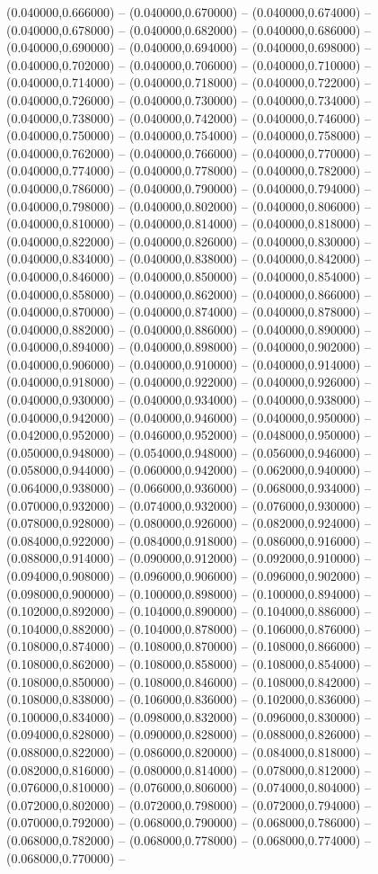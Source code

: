 (0.040000,0.666000) -- (0.040000,0.670000) -- (0.040000,0.674000) -- (0.040000,0.678000) -- (0.040000,0.682000) -- (0.040000,0.686000) -- (0.040000,0.690000) -- (0.040000,0.694000) -- (0.040000,0.698000) -- (0.040000,0.702000) -- (0.040000,0.706000) -- (0.040000,0.710000) -- (0.040000,0.714000) -- (0.040000,0.718000) -- (0.040000,0.722000) -- (0.040000,0.726000) -- (0.040000,0.730000) -- (0.040000,0.734000) -- (0.040000,0.738000) -- (0.040000,0.742000) -- (0.040000,0.746000) -- (0.040000,0.750000) -- (0.040000,0.754000) -- (0.040000,0.758000) -- (0.040000,0.762000) -- (0.040000,0.766000) -- (0.040000,0.770000) -- (0.040000,0.774000) -- (0.040000,0.778000) -- (0.040000,0.782000) -- (0.040000,0.786000) -- (0.040000,0.790000) -- (0.040000,0.794000) -- (0.040000,0.798000) -- (0.040000,0.802000) -- (0.040000,0.806000) -- (0.040000,0.810000) -- (0.040000,0.814000) -- (0.040000,0.818000) -- (0.040000,0.822000) -- (0.040000,0.826000) -- (0.040000,0.830000) -- (0.040000,0.834000) -- (0.040000,0.838000) -- (0.040000,0.842000) -- (0.040000,0.846000) -- (0.040000,0.850000) -- (0.040000,0.854000) -- (0.040000,0.858000) -- (0.040000,0.862000) -- (0.040000,0.866000) -- (0.040000,0.870000) -- (0.040000,0.874000) -- (0.040000,0.878000) -- (0.040000,0.882000) -- (0.040000,0.886000) -- (0.040000,0.890000) -- (0.040000,0.894000) -- (0.040000,0.898000) -- (0.040000,0.902000) -- (0.040000,0.906000) -- (0.040000,0.910000) -- (0.040000,0.914000) -- (0.040000,0.918000) -- (0.040000,0.922000) -- (0.040000,0.926000) -- (0.040000,0.930000) -- (0.040000,0.934000) -- (0.040000,0.938000) -- (0.040000,0.942000) -- (0.040000,0.946000) -- (0.040000,0.950000) -- (0.042000,0.952000) -- (0.046000,0.952000) -- (0.048000,0.950000) -- (0.050000,0.948000) -- (0.054000,0.948000) -- (0.056000,0.946000) -- (0.058000,0.944000) -- (0.060000,0.942000) -- (0.062000,0.940000) -- (0.064000,0.938000) -- (0.066000,0.936000) -- (0.068000,0.934000) -- (0.070000,0.932000) -- (0.074000,0.932000) -- (0.076000,0.930000) -- (0.078000,0.928000) -- (0.080000,0.926000) -- (0.082000,0.924000) -- (0.084000,0.922000) -- (0.084000,0.918000) -- (0.086000,0.916000) -- (0.088000,0.914000) -- (0.090000,0.912000) -- (0.092000,0.910000) -- (0.094000,0.908000) -- (0.096000,0.906000) -- (0.096000,0.902000) -- (0.098000,0.900000) -- (0.100000,0.898000) -- (0.100000,0.894000) -- (0.102000,0.892000) -- (0.104000,0.890000) -- (0.104000,0.886000) -- (0.104000,0.882000) -- (0.104000,0.878000) -- (0.106000,0.876000) -- (0.108000,0.874000) -- (0.108000,0.870000) -- (0.108000,0.866000) -- (0.108000,0.862000) -- (0.108000,0.858000) -- (0.108000,0.854000) -- (0.108000,0.850000) -- (0.108000,0.846000) -- (0.108000,0.842000) -- (0.108000,0.838000) -- (0.106000,0.836000) -- (0.102000,0.836000) -- (0.100000,0.834000) -- (0.098000,0.832000) -- (0.096000,0.830000) -- (0.094000,0.828000) -- (0.090000,0.828000) -- (0.088000,0.826000) -- (0.088000,0.822000) -- (0.086000,0.820000) -- (0.084000,0.818000) -- (0.082000,0.816000) -- (0.080000,0.814000) -- (0.078000,0.812000) -- (0.076000,0.810000) -- (0.076000,0.806000) -- (0.074000,0.804000) -- (0.072000,0.802000) -- (0.072000,0.798000) -- (0.072000,0.794000) -- (0.070000,0.792000) -- (0.068000,0.790000) -- (0.068000,0.786000) -- (0.068000,0.782000) -- (0.068000,0.778000) -- (0.068000,0.774000) -- (0.068000,0.770000) -- 
